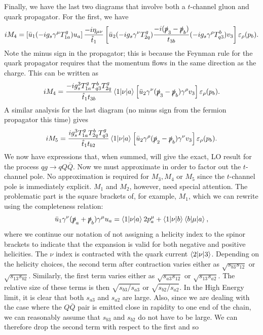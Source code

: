 Finally, we have the last two diagrams that involve both a $t$-channel gluon and quark propagator. For the first, we have
\begin{equation}
iM_4 = \left[\bar{u}_1 (-i g_s \gamma^\mu T^g_{1a}) u_a \right] \frac{-i \eta_{\mu \nu}}{\hat{t}_1} \left[\bar{u}_2 (-i g_s \gamma^\nu T^g_{2q}) \frac{-i (\slashed{p}_3 - \slashed{p}_b )}{t_{3b}} (-i g_s \gamma^\rho T^b_{q3})v_3 \right] \varepsilon_\rho (p_b).
\end{equation}
Note the minus sign in the propagator; this is because the Feynman rule for the quark propagator requires that the momentum flows in the same direction as the charge. This can be written as
\begin{equation}
iM_4 = \frac{-i g_s^3 T^g_{1a}T^b_{q3}T^g_{2q}}{\hat{t}_1 t_{3b}} \mathinner{\langle1\vert\nu\vert a\rangle}_{}\left[\bar{u}_2 \gamma^\nu (\slashed{p}_3 - \slashed{p}_b) \gamma^\rho v_3 \right] \varepsilon_\rho (p_b).
\end{equation}
A similar analysis for the last diagram (no minus sign from the fermion propagator this time) gives
\begin{equation}
iM_5 = \frac{i g_s^3 T^g_{1a}T^b_{2q}T^g_{q3}}{\hat{t}_1 t_{b2}} \mathinner{\langle1\vert\nu\vert a\rangle}_{}\left[\bar{u}_2 \gamma^\rho (\slashed{p}_2 - \slashed{p}_b) \gamma^\nu v_3 \right] \varepsilon_\rho (p_b).
\end{equation}
We now have expressions that, when summed, will give the exact, LO result for the process $qg \to qQ\bar{Q}$. Now we must approximate in order to factor out the $t$-channel pole. No approximation is required for $M_3, M_4$ or $M_5$ since the $t$-channel pole is immediately explicit. $M_1$ and $M_2$, however, need special attention. The problematic part is the square brackets of, for example, $M_1$, which we can rewrite using the completeness relation:
\begin{equation}
\bar{u}_1 \gamma^\nu (\slashed{p}_a + \slashed{p}_b) \gamma^\mu u_a = \mathinner{\langle1\vert\nu\vert a\rangle}_{}2 p_a^\mu + \mathinner{\langle1\vert\nu\vert b\rangle}_{} \mathinner{\langle b\vert\mu\vert a\rangle}_{},
\end{equation}
where we continue our notation of not assigning a helicity index to the spinor brackets to indicate that the expansion is valid for both negative and positive helicities. The $\nu$ index is contracted with the quark current $\mathinner{\langle2\vert\nu\vert3\rangle}_{}$. Depending on the helicity choices, the second term after contraction varies either as $\sqrt{s_{b3} s_{12}}$ or $\sqrt{s_{13} s_{b2}}$. Similarly, the first term varies either as $\sqrt{s_{a3} s_{12}}$ or $\sqrt{s_{13} s_{a2}}$. The relative size of these terms is then $\sqrt{s_{b3}/s_{a3}}$ or $\sqrt{s_{b2}/s_{a2}}$. In the High Energy limit, it is clear that both $s_{a3}$ and $s_{a2}$ are large. Also, since we are dealing with the case where the $Q\bar{Q}$ pair is emitted close in rapidity to one end of the chain, we can reasonably assume that $s_{b3}$ and $s_{b2}$ do not have to be large. We can therefore drop the second term with respect to the first and so
